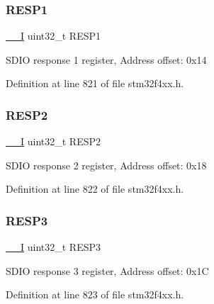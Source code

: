 \subsubsection{\texorpdfstring{R\+E\+S\+P1}{RESP1}}
{\footnotesize\ttfamily \hyperlink{group___c_m_s_i_s__core__definitions_gaf63697ed9952cc71e1225efe205f6cd3}{\+\_\+\+\_\+I} uint32\+\_\+t R\+E\+S\+P1}

S\+D\+IO response 1 register, Address offset\+: 0x14 

Definition at line 821 of file stm32f4xx.\+h.

\mbox{\label{struct_s_d_i_o___type_def_a4d99c78dffdb6e81e8f6b7abec263419}} 
\subsubsection{\texorpdfstring{R\+E\+S\+P2}{RESP2}}
{\footnotesize\ttfamily \hyperlink{group___c_m_s_i_s__core__definitions_gaf63697ed9952cc71e1225efe205f6cd3}{\+\_\+\+\_\+I} uint32\+\_\+t R\+E\+S\+P2}

S\+D\+IO response 2 register, Address offset\+: 0x18 

Definition at line 822 of file stm32f4xx.\+h.

\mbox{\label{struct_s_d_i_o___type_def_a3da04fbdd44f48a1840e5e0a6295f3cf}} 
\subsubsection{\texorpdfstring{R\+E\+S\+P3}{RESP3}}
{\footnotesize\ttfamily \hyperlink{group___c_m_s_i_s__core__definitions_gaf63697ed9952cc71e1225efe205f6cd3}{\+\_\+\+\_\+I} uint32\+\_\+t R\+E\+S\+P3}

S\+D\+IO response 3 register, Address offset\+: 0x1C 

Definition at line 823 of file stm32f4xx.\+h.

\mbox{\label{struct_s_d_i_o___type_def_ac760383de212de696f504e744c6fca7e}} 
